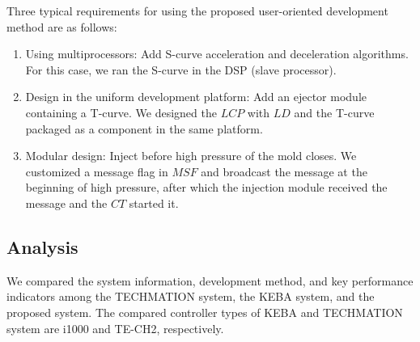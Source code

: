 \documentclass[journal,UTF8]{IEEEtran}
\begin{document}
Three typical requirements for using the proposed user-oriented development method are as follows:
\begin{enumerate}
	\item Using multiprocessors: Add S-curve acceleration and deceleration algorithms. For this case, we ran the S-curve in the DSP (slave processor).
	\item Design in the uniform development platform: Add an ejector module containing a T-curve. We designed the $LCP$ with $LD$ and the T-curve packaged as a component in the same platform.
	\item Modular design: Inject before high pressure of the mold closes. We customized a message flag in $MSF$ and broadcast the message at the beginning of high pressure, after which the injection module received the message and the $CT$ started it.
\end{enumerate}
\subsection{Analysis}
We compared the system information, development method, and key performance indicators among the TECHMATION system, the KEBA system, and the proposed system. The compared controller types of KEBA and TECHMATION system are i1000 and TE-CH2, respectively. 
\end{document}

